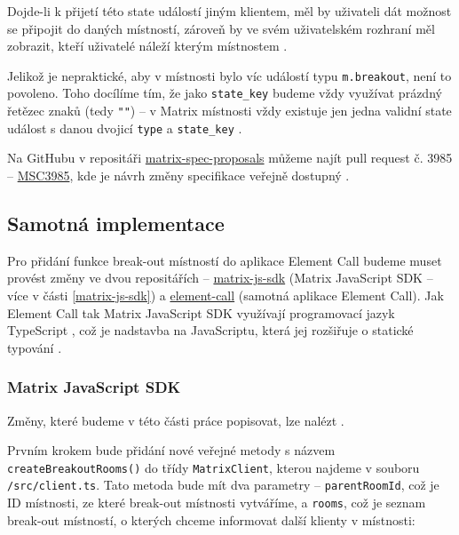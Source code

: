 Dojde-li k přijetí této state událostí jiným klientem, měl by uživateli dát
možnost se připojit do daných místností, zároveň by ve svém uživatelském
rozhraní měl zobrazit, kteří uživatelé náleží kterým místnostem
\parencite{GitHub-MSC3985}.

Jelikož je nepraktické, aby v místnosti bylo víc událostí typu
\texttt{m.breakout}, není to povoleno. Toho docílíme tím, že jako
\texttt{state_key} budeme vždy využívat prázdný řetězec znaků (tedy
\texttt{""}) \parencite{GitHub-MSC3985} -- v Matrix místnosti vždy
existuje jen jedna validní state událost s danou dvojicí \texttt{type}
a \texttt{state_key} \parencite{MatrixORG-Spec}.

Na GitHubu v repositáři
\href{https://github.com/matrix-org/matrix-spec-proposals}{matrix-spec-proposals}
můžeme najít pull request č. 3985 --
\href{https://github.com/matrix-org/matrix-spec-proposals/pull/3985}{MSC3985},
kde je návrh změny specifikace veřejně dostupný \parencite{GitHub-MSC3985}.

\subsection{Samotná implementace}

Pro přidání funkce break-out místností do aplikace Element Call budeme muset
provést změny ve dvou repositářích --
\href{https://github.com/matrix-org/matrix-js-sdk/}{matrix-js-sdk} (Matrix
JavaScript SDK -- více v části \ref{matrix-js-sdk}) a
\href{https://github.com/vector-im/element-call/}{element-call} (samotná
aplikace Element Call). Jak Element Call tak Matrix JavaScript SDK využívají
programovací jazyk TypeScript \parencite{GitHub-MatrixJSSDK,
    GitHub-ElementCall}, což je nadstavba na JavaScriptu, která jej rozšiřuje o
statické typování \parencite{TypeScript-Homepage}.

\subsubsection{Matrix JavaScript SDK}

Změny, které budeme v této části práce popisovat, lze nalézt
\iftoggle{school}{v příloze (viz
    část
    \ref{attachment})}{\href{https://github.com/matrix-org/matrix-js-sdk/pull/3753/}{zde}
    \parencite{GitHub-MatrixJSSDK-BreakoutRooms}}.

Prvním krokem bude přidání nové veřejné metody s názvem
\texttt{createBreakoutRooms()} do třídy
\texttt{MatrixClient}, kterou najdeme v souboru
\texttt{/src/client.ts}. Tato metoda bude mít dva parametry --
\texttt{parentRoomId}, což je ID místnosti, ze které break-out
místnosti vytváříme, a \texttt{rooms}, což je seznam break-out
místností, o kterých chceme informovat další klienty v místnosti:

